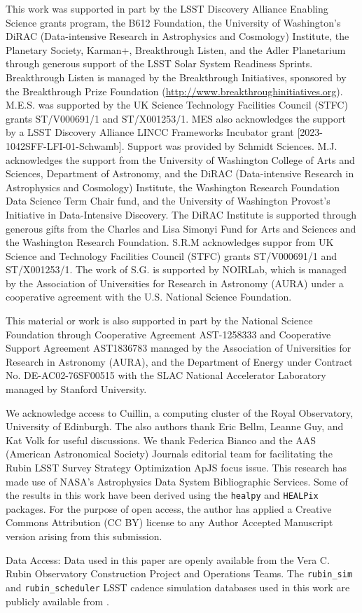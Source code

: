 \documentclass[preprintm,linenumbers]{aastex631}
\newcommand{\rubinsim}{\texttt{rubin\_sim}\xspace}
\newcommand{\healpix}{\texttt{HEALPix}\xspace} %
\newcommand{\healpy}{\texttt{healpy}\xspace}
\begin{document}
\begin{acknowledgments}

This work was supported in part by the LSST Discovery Alliance Enabling Science grants program, the B612 Foundation, the University of Washington's DiRAC (Data-intensive Research in Astrophysics and Cosmology) Institute, the Planetary Society, Karman+, Breakthrough Listen, and the Adler Planetarium through generous support of the LSST Solar System Readiness Sprints. Breakthrough Listen is managed by the Breakthrough Initiatives, sponsored by the Breakthrough Prize Foundation (\url{http://www.breakthroughinitiatives.org}). M.E.S. was supported by the UK Science Technology Facilities Council (STFC) grants ST/V000691/1 and ST/X001253/1. MES also acknowledges the support by a LSST Discovery Alliance LINCC Frameworks Incubator grant [2023-1042SFF-LFI-01-Schwamb]. Support was provided by Schmidt Sciences. M.J. acknowledges the support from the University of Washington College of Arts and Sciences, Department of Astronomy, and the DiRAC (Data-intensive Research in Astrophysics and Cosmology) Institute, the Washington Research Foundation Data Science Term Chair fund, and the University of Washington Provost's Initiative in Data-Intensive Discovery. The DiRAC Institute is supported through generous gifts from the Charles and Lisa Simonyi Fund for Arts and Sciences and the Washington Research Foundation. S.R.M acknowledges suppor from UK Science and Technology Facilities Council (STFC) grants ST/V000691/1 and ST/X001253/1. The work of S.G. is supported by NOIRLab, which is managed by the Association of Universities for Research in Astronomy (AURA) under a cooperative agreement with the U.S. National Science Foundation.

This material or work is also supported in part by the National Science Foundation through Cooperative Agreement AST-1258333 and Cooperative Support Agreement AST1836783 managed by the Association of Universities for Research in Astronomy (AURA), and the Department of Energy under Contract No. DE-AC02-76SF00515 with the SLAC National Accelerator Laboratory managed by Stanford University.

We acknowledge access to Cuillin, a computing cluster of the Royal Observatory, University of Edinburgh. The also authors thank Eric Bellm, Leanne Guy, and Kat Volk for useful discussions. We thank Federica Bianco and the AAS (American Astronomical Society) Journals editorial team for facilitating the Rubin LSST Survey Strategy Optimization ApJS focus issue. This research has made use of NASA's Astrophysics Data System Bibliographic Services. Some of the results in this work have been derived using the \healpy and \healpix packages. For the purpose of open access, the author has applied a Creative Commons Attribution (CC BY) license to any Author Accepted Manuscript version arising from this submission.	
			
Data Access:  Data used in this paper are openly available from the Vera C. Rubin Observatory Construction Project and Operations Teams. The \rubinsim and \texttt{rubin\_scheduler} LSST cadence simulation databases used in this work are publicly available from \cite{v4.0sims}.
			
		\end{acknowledgments}
\end{document}
